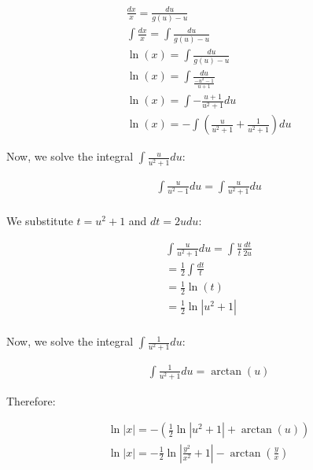 \documentclass{article}
\begin{document}
\begin{singlespace}
\begin{flushleft}
        \end{flushleft}
        \begin{align*}
            &\frac{dx}{x} = \frac{du}{g(u)-u} \\
            &\int \frac{dx}{x} = \int \frac{du}{g(u)-u} \\
            &\ln(x) = \int \frac{du}{g(u)-u} \\
            &\ln(x) = \int \frac{du}{\frac{-u^{2}-1}{u+1}} \\
            &\ln(x) = \int -\frac{u+1}{u^{2}+1}du \\
            &\ln(x) = -\int \left( \frac{u}{u^{2}+1}+\frac{1}{u^{2}+1}\right)du
        \end{align*}
        \begin{flushleft}
            Now, we solve the integral $\int \frac{u}{u^{2}+1}du$:\\
        \end{flushleft}
        \begin{align*}
            &\int \frac{u}{u^{2}-1}du = \int \frac{u}{u^{2}+1}du \\
        \end{align*}
        \begin{center}
            We substitute $t=u^{2}+1$ and $dt=2udu$:
        \end{center}
        \begin{align*}
            & \int \frac{u}{u^{2}+1}du = \int \frac{u}{t}\frac{dt}{2u} \\
            &= \frac{1}{2}\int \frac{dt}{t} \\
            &= \frac{1}{2}\ln(t) \\
            &= \frac{1}{2}\ln|u^{2}+1| \\
        \end{align*}
        \begin{flushleft}
            Now, we solve the integral $\int \frac{1}{u^{2}+1}du$:\\
        \end{flushleft}
        \begin{align*}
            & \int \frac{1}{u^{2}+1}du=\arctan(u)
        \end{align*}
        \begin{flushleft}
            Therefore:
        \end{flushleft}
        \begin{align*}
            &\ln|x| = -\left(\frac{1}{2}\ln|u^{2}+1| + \arctan(u)\right) \\
            &\ln|x| = -\frac{1}{2}\ln|\frac{y^{2}}{x^{2}}+1|- \arctan\left(\frac{y}{x}\right) \\
        \end{align*}
    \end{singlespace}
\end{document}
